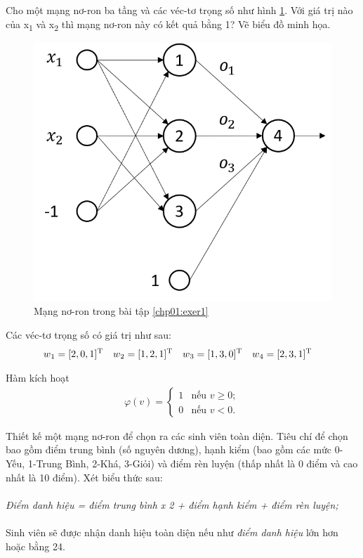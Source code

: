 \begin{exer}
\label{chp01:exer1}
Cho một mạng nơ-ron ba tầng và các véc-tơ trọng số như hình \ref{fig:exercise1}. Với giá trị nào của x\textsubscript{1} và x\textsubscript{2} thì mạng nơ-ron này có kết quả bằng 1? Vẽ biểu đồ minh họa.
\begin{figure}[!h]
	\centering
		\includegraphics[width=0.5\columnwidth]{chapter01/figure/excercise-1.png}
    	\caption{Mạng nơ-ron trong bài tập \ref{chp01:exer1}}
	\centering
	\label{fig:exercise1}
\end{figure}

Các véc-tơ trọng số có giá trị như sau:
\begin{align*}
w\textsubscript{1} = [2,0,1] \textsuperscript{T} \quad w\textsubscript{2} = [1,2,1] \textsuperscript{T} \quad w\textsubscript{3} = [1,3,0] \textsuperscript{T} \quad w\textsubscript{4} = [2,3,1] \textsuperscript{T} \quad
\end{align*}

Hàm kích hoạt
\begin{align*}
        \varphi (v) = \left\{ \begin{array}{ll}
        1 & \mbox{nếu $v \geq 0$};\\
        0 & \mbox{nếu $v < 0$}.\end{array} \right.
\end{align*}
\end{exer}

\begin{exer}
\label{chp01:exer2}
Thiết kế một mạng nơ-ron để chọn ra các sinh viên toàn diện. Tiêu chí để chọn bao gồm điểm trung bình (số nguyên dương), hạnh kiểm (bao gồm các mức 0-Yếu, 1-Trung Bình, 2-Khá, 3-Giỏi) và điểm rèn luyện (thấp nhất là 0 điểm và cao nhất là 10 điểm). Xét biểu thức sau:\\
\\
\textit{Điểm danh hiệu =  điểm trung bình x 2 + điểm hạnh kiểm + điểm rèn luyện;}\\
\\
\noindent Sinh viên sẽ được nhận danh hiệu toàn diện nếu như \textit{điểm danh hiệu} lớn hơn hoặc bằng 24.
\end{exer}

